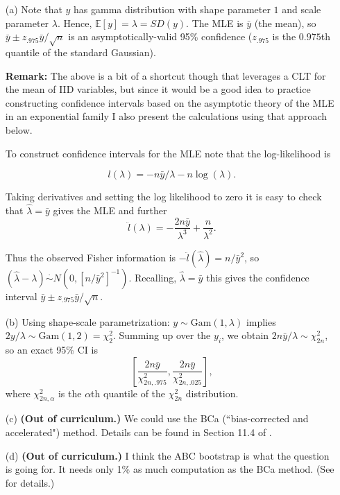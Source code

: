 \begin{itemize}
\item[(a)] Note that $y$ has gamma distribution with shape parameter $1$ and scale parameter $\lambda$. Hence, $\mathbb E[y] = \lambda = SD(y)$. The MLE is $\bar{y}$ (the mean), so $\bar{y} \pm z_{.975}\bar{y}/\sqrt{n}$ is an asymptotically-valid 95\% confidence ($z_{.975}$ is the $0.975$th quantile of the standard Gaussian).

\textbf{Remark:} The above is a bit of a shortcut though that leverages a CLT for the mean of IID variables, but since it would be a good idea to practice constructing confidence intervals based on the asymptotic theory of the MLE in an exponential family I also present the calculations using that approach below. \newline

To construct confidence intervals for the MLE note that the log-likelihood is 

$$l(\lambda) = -n \bar{y}/\lambda -n \log (\lambda).$$

Taking derivatives and setting the log likelihood to zero it is easy to check that $\hat{\lambda}=\bar{y}$ gives the MLE and further $$\ddot{l}(\lambda)=-\frac{2n \bar{y}}{\lambda^3} + \frac{n}{\lambda^2}.$$

Thus the observed Fisher information is $-\ddot{l}(\hat{\lambda})=n/\bar{y}^2$, so $(\hat{\lambda} -\lambda) \stackrel{\cdot}{\sim} N(0,[n/\bar{y}^2]^{-1} )$.  Recalling, $\hat{\lambda}=\bar{y}$ this gives the confidence interval $\bar{y} \pm z_{.975}\bar{y}/\sqrt{n}$.


\item[(b)] Using shape-scale parametrization: $y \sim \text{Gam}(1, \lambda)$ implies $2y/ \lambda \sim \text{Gam}(1, 2) = \chi_2^2$. Summing up over the $y_i$, we obtain $2n\bar{y}/\lambda \sim \chi^2_{2n}$, so an exact 95\% CI is \[\left[
		\frac{2n\bar{y}}{\chi^2_{2n,.975}},\frac{2n\bar{y}}{\chi^2_{2n,.025}}\right],\]
		where $\chi^2_{2n,\alpha}$ is the $\alpha$th quantile of the
		$\chi^2_{2n}$ distribution.

\item[(c)] \textbf{(Out of curriculum.)} We could use the BCa (``bias-corrected and accelerated") method. Details can be found in Section 11.4 of \citep*{efron2016computer}.

\item[(d)] \textbf{(Out of curriculum.)} I think the ABC bootstrap is what the question is going for. It needs only 1\% as much computation as the BCa method. (See \citep*{DiCiccioBootstrap} for details.)

\end{itemize}


